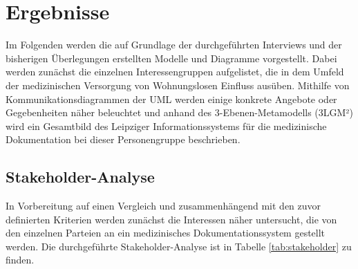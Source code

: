 \chapter{Ergebnisse}\label{ch:results}

Im Folgenden werden die auf Grundlage der durchgeführten Interviews und der bisherigen Überlegungen erstellten Modelle und Diagramme vorgestellt. Dabei werden zunächst die einzelnen Interessengruppen aufgelistet, die in dem Umfeld der medizinischen Versorgung von Wohnungslosen Einfluss ausüben. Mithilfe von Kommunikationsdiagrammen der \ac{UML} werden einige konkrete Angebote oder Gegebenheiten näher beleuchtet und anhand des 3-Ebenen-Metamodells (\acs{3LGM²}) wird ein Gesamtbild des Leipziger Informationssystems für die medizinische Dokumentation bei dieser Personengruppe beschrieben.

\section{Stakeholder-Analyse}\label{sec:stakeholder}

In Vorbereitung auf einen Vergleich und zusammenhängend mit den zuvor definierten Kriterien werden zunächst die Interessen näher untersucht, die von den einzelnen Parteien an ein medizinisches Dokumentationssystem gestellt werden. Die durchgeführte Stakeholder-Analyse ist in Tabelle \ref{tab:stakeholder} zu finden.

